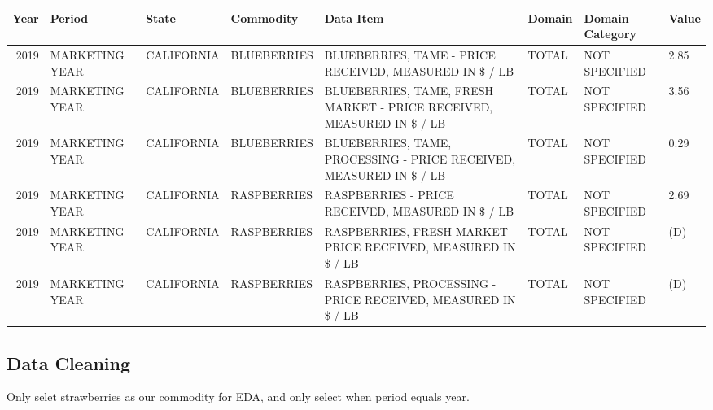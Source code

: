 \documentclass[
]{article}
\newenvironment{Shaded}{\begin{snugshade}}{\end{snugshade}}
\newcommand{\CommentTok}[1]{\textcolor[rgb]{0.56,0.35,0.01}{\textit{#1}}}
\newcommand{\DataTypeTok}[1]{\textcolor[rgb]{0.13,0.29,0.53}{#1}}
\newcommand{\KeywordTok}[1]{\textcolor[rgb]{0.13,0.29,0.53}{\textbf{#1}}}
\newcommand{\NormalTok}[1]{#1}
\newcommand{\OperatorTok}[1]{\textcolor[rgb]{0.81,0.36,0.00}{\textbf{#1}}}
\newcommand{\StringTok}[1]{\textcolor[rgb]{0.31,0.60,0.02}{#1}}
\begin{document}
\begin{table}[H]
\centering\begingroup\fontsize{12}{14}\selectfont

\begin{tabular}{r|l|l|l|l|l|l|l}
\hline
Year & Period & State & Commodity & Data Item & Domain & Domain Category & Value\\
\hline
2019 & MARKETING YEAR & CALIFORNIA & BLUEBERRIES & BLUEBERRIES, TAME - PRICE RECEIVED, MEASURED IN \$ / LB & TOTAL & NOT SPECIFIED & 2.85\\
\hline
2019 & MARKETING YEAR & CALIFORNIA & BLUEBERRIES & BLUEBERRIES, TAME, FRESH MARKET - PRICE RECEIVED, MEASURED IN \$ / LB & TOTAL & NOT SPECIFIED & 3.56\\
\hline
2019 & MARKETING YEAR & CALIFORNIA & BLUEBERRIES & BLUEBERRIES, TAME, PROCESSING - PRICE RECEIVED, MEASURED IN \$ / LB & TOTAL & NOT SPECIFIED & 0.29\\
\hline
2019 & MARKETING YEAR & CALIFORNIA & RASPBERRIES & RASPBERRIES - PRICE RECEIVED, MEASURED IN \$ / LB & TOTAL & NOT SPECIFIED & 2.69\\
\hline
2019 & MARKETING YEAR & CALIFORNIA & RASPBERRIES & RASPBERRIES, FRESH MARKET - PRICE RECEIVED, MEASURED IN \$ / LB & TOTAL & NOT SPECIFIED & (D)\\
\hline
2019 & MARKETING YEAR & CALIFORNIA & RASPBERRIES & RASPBERRIES, PROCESSING - PRICE RECEIVED, MEASURED IN \$ / LB & TOTAL & NOT SPECIFIED & (D)\\
\hline
\end{tabular}
\endgroup{}
\end{table}

\hypertarget{data-cleaning}{%
\subsection{Data Cleaning}\label{data-cleaning}}

Only selet strawberries as our commodity for EDA, and only select when
period equals year.

\begin{Shaded}
\end{Shaded}
\end{document}
